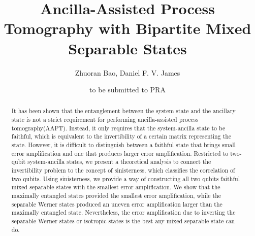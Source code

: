 \documentclass[a4paper, amsfonts, amssymb, amsmath, reprint, showkeys, nofootinbib, twoside]{revtex4-1}
\begin{document}
\title{Ancilla-Assisted Process Tomography with Bipartite Mixed Separable States}

\author{Zhuoran Bao, Daniel F. V. James}

\date{to be submitted to PRA} 

\begin{abstract}
It has been shown that the entanglement between the system state and the ancillary state is not a strict requirement for performing ancilla-assisted process tomography(AAPT). Instead, it only requires that the system-ancilla state to be faithful, which is equivalent to the invertibility of a certain matrix representing the state. However, it is difficult to distinguish between a faithful state that brings small error amplification and one that produces larger error amplification. Restricted to two-qubit system-ancilla states, we present a theoretical analysis to connect the invertibility problem to the concept of sinisterness, which classifies the correlation of two qubits. Using sinisterness, we provide a way of constructing all two qubits faithful mixed separable states with the smallest error amplification. We show that the maximally entangled states provided the smallest error amplification, while the separable Werner states produced an uneven error amplification larger than the maximally entangled state. Nevertheless, the error amplification due to inverting the separable Werner states or isotropic states is the best any mixed separable state can do.
\end{abstract}



\maketitle






%
\end{document}
